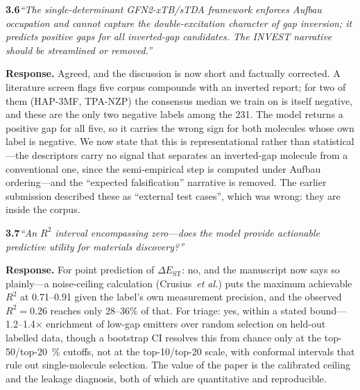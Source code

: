 \documentclass[12pt,a4paper]{letter}
\begin{document}
\medskip
\noindent\textbf{3.6}\quad\textit{``The single-determinant GFN2-xTB/sTDA framework
enforces Aufbau occupation and cannot capture the double-excitation character of
gap inversion; it predicts positive gaps for all inverted-gap candidates. The
INVEST narrative should be streamlined or removed.''}

\smallskip
\noindent\textbf{Response.}
Agreed, and the discussion is now short and factually corrected. A literature screen
flags five corpus compounds with an inverted report; for two of them (HAP-3MF,
TPA-NZP) the consensus median we train on is itself negative, and these are the only two
negative labels among the \num{231}. The model returns a positive gap for all five, so it
carries the wrong sign for both molecules whose own label is negative. We now state that
this is representational rather than statistical---the descriptors carry no signal that
separates an inverted-gap molecule from a conventional one, since the semi-empirical step
is computed under Aufbau ordering---and the ``expected falsification'' narrative is
removed. The earlier submission described these as
``external test cases'', which was wrong: they are inside the corpus.

\medskip
\noindent\textbf{3.7}\quad\textit{``An $R^2$ interval encompassing zero---does the
model provide actionable predictive utility for materials discovery?''}

\smallskip
\noindent\textbf{Response.}
For point prediction of $\Delta E_\text{ST}$: no, and the manuscript now says so
plainly---a noise-ceiling calculation (Crusius~\textit{et al.}) puts the maximum
achievable $R^2$ at \num{0.71}--\num{0.91} given the label's own measurement
precision, and the observed $R^2 = 0.26$ reaches only \num{28}--\num{36}\% of that.
For triage: yes, within a stated bound---\num{1.2}--\num{1.4}$\times$
enrichment of low-gap emitters over random selection on held-out labelled data,
though a bootstrap CI resolves this from chance only at the
top-\num{50}/top-\qty{20}{\percent} cutoffs, not at the top-\num{10}/top-\num{20} scale,
with conformal intervals that rule out single-molecule selection. The value of
the paper is the calibrated ceiling and the leakage diagnosis, both of which are
quantitative and reproducible.
\end{document}
